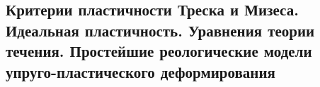 

\subsection{Критерии пластичности Треска и Мизеса. Идеальная пластичность. Уравнения теории течения. Простейшие реологические модели упруго-пластического деформирования}



